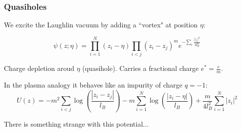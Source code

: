 \documentclass{beamer}
\begin{document}
\begin{frame}
\frametitle{Quasiholes}
\begin{center}
We excite the Laughlin vacuum by adding a ``vortex" at position $\eta$:

\[
\psi \left( z ; \eta \right) = \prod_{i = 1}^N \left( z_i - \eta \right) \prod_{i < j} \left( z_i - z_j \right)^m e^{-\sum_{i} \frac{| z_i |^2}{4 l_B^2}}
\]

Charge depletion aroud $\eta$ (quasihole). Carries a fractional charge $e^{*} = \frac{e}{m}$.

In the plasma analogy it behaves like an impurity of charge $q = -1$:
\[
U(z) = - m^2 \sum_{i < j} \log \left( \frac{| z_i - z_j|}{l_B} \right) - m \sum_{i = 1}^{N} \log \left( \frac{| z_i - \eta|}{l_B} \right) + \frac{m}{4 l_B^2} \sum_{i = 1}^{N} |z_i|^2 
\]

There is something strange with this potential...

\end{center}
\end{frame}

\end{document}

